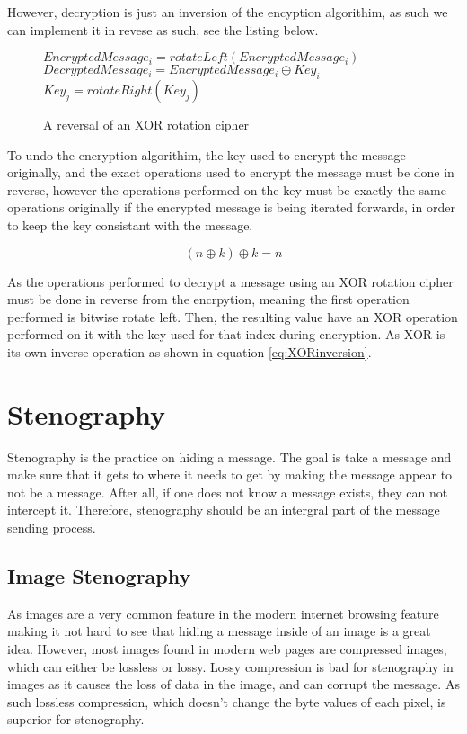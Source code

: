 \documentclass[12pt]{article}
\begin{document}
    However, decryption is just an inversion of the encyption algorithim,
    as such we can implement it in revese as such, see the listing below.

    \begin{figure}[h]
    \begin{algorithmic}[1]
      \State $EncryptedMessage_i = rotateLeft(EncryptedMessage_i)$
      \State $DecryptedMessage_i = EncryptedMessage_i \oplus Key_i$
          \State $Key_j = rotateRight(Key_j)$
        \EndFor
      \EndIf
    \EndFor
    \end{algorithmic}
    \caption{A reversal of an XOR rotation cipher}
    \end{figure}

    To undo the encryption algorithim, the key used to encrypt the message
    originally, and the exact operations used to encrypt the message must
    be done in reverse, however the operations performed on the key must be
    exactly the same operations originally if the encrypted message is being
    iterated forwards, in order to keep the key consistant with the message.
    
    \begin{equation}
      \label{eq:XORinversion}
      (n \oplus k) \oplus k = n
    \end{equation}

    As the operations performed to decrypt a message using an XOR rotation
    cipher must be done in reverse from the encrpytion, meaning the first
    operation performed is bitwise rotate left. Then, the resulting value
    have an XOR operation performed on it with the key used for that index
    during encryption. As XOR is its own inverse operation as shown in
    equation \eqref{eq:XORinversion}.  
      
\section{Stenography}
  Stenography is the practice on hiding a message. The goal is take
  a message and make sure that it gets to where it needs to get by
  making the message appear to not be a message. After all, if one
  does not know a message exists, they can not intercept it. Therefore,
  stenography should be an intergral part of the message sending process.
  
  \subsection{Image Stenography}
    As images are a very common feature in the modern internet browsing
    feature making it not hard to see that hiding a message inside of an
    image is a great idea. However, most images found in modern web pages
    are compressed images, which can either be lossless or lossy. Lossy
    compression is bad for stenography in images as it causes the loss
    of data in the image, and can corrupt the message. As such lossless
    compression, which doesn't change the byte values of each pixel, is
    superior for stenography.
\end{document}

